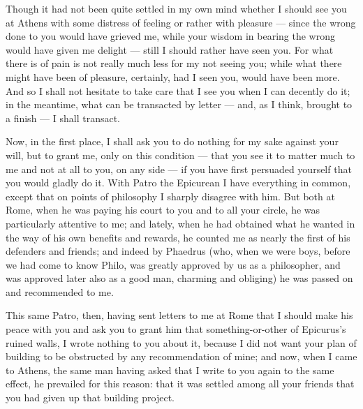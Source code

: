 

 Though it had not been quite settled in my own mind whether I should see you at Athens with some distress of feeling or rather with pleasure --- since the wrong done to you would have grieved me, while your wisdom in bearing the wrong would have given me delight --- still I should rather have seen you. For what there is of pain is not really much less for my not seeing you; while what there might have been of pleasure, certainly, had I seen you, would have been more. And so I shall not hesitate to take care that I see you when I can decently do it; in the meantime, what can be transacted by letter --- and, as I think, brought to a finish --- I shall transact.

 Now, in the first place, I shall ask you to do nothing for my sake against your will, but to grant me, only on this condition --- that you see it to matter much to me and not at all to you, on any side --- if you have first persuaded yourself that you would gladly do it. With Patro the Epicurean I have everything in common, except that on points of philosophy I sharply disagree with him. But both at Rome, when he was paying his court to you and to all your circle, he was particularly attentive to me; and lately, when he had obtained what he wanted in the way of his own benefits and rewards, he counted me as nearly the first of his defenders and friends; and indeed by Phaedrus (who, when we were boys, before we had come to know Philo, was greatly approved by us as a philosopher, and was approved later also as a good man, charming and obliging) he was passed on and recommended to me.

 This same Patro, then, having sent letters to me at Rome that I should make his peace with you and ask you to grant him that something-or-other of Epicurus's ruined walls, I wrote nothing to you about it, because I did not want your plan of building to be obstructed by any recommendation of mine; and now, when I came to Athens, the same man having asked that I write to you again to the same effect, he prevailed for this reason: that it was settled among all your friends that you had given up that building project.

